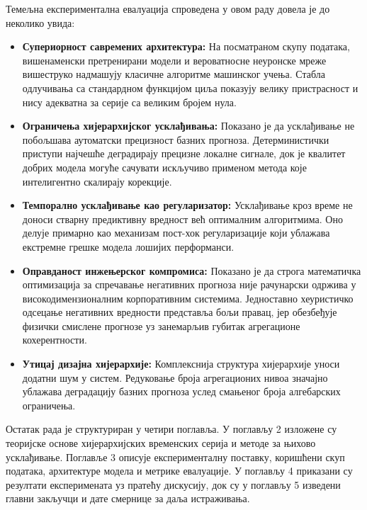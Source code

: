 \documentclass[12pt,oneside]{memoir}
\begin{document}
Темељна експериментална евалуација спроведена у овом раду довела је до неколико увида:

\begin{itemize}
    \item \textbf{Супериорност савремених архитектура:} На посматраном скупу података, вишенаменски претренирани модели и вероватносне неуронске мреже вишеструко надмашују класичне алгоритме машинског учења. Стабла одлучивања са стандардном функцијом циља показују велику пристрасност и нису адекватна за серије са великим бројем нула.
    
    \item \textbf{Ограничења хијерархијског усклађивања:} Показано је да усклађивање не побољшава аутоматски прецизност базних прогноза. Детерминистички приступи најчешће деградирају прецизне локалне сигнале, док је квалитет добрих модела могуће сачувати искључиво применом метода које интелигентно скалирају корекције.
    
    \item \textbf{Темпорално усклађивање као регуларизатор:} Усклађивање кроз време не доноси стварну предиктивну вредност већ оптималним алгоритмима. Оно делује примарно као механизам пост-хок регуларизације који ублажава екстремне грешке модела лошијих перформанси.
    
    \item \textbf{Оправданост инжењерског компромиса:} Показано је да строга математичка оптимизација за спречавање негативних прогноза није рачунарски одржива у високодимензионалним корпоративним системима. Једноставно хеуристичко одсецање негативних вредности представља бољи правац, јер обезбеђује физички смислене прогнозе уз занемарљив губитак агрегационе кохерентности.
    
    \item \textbf{Утицај дизајна хијерархије:} Комплекснија структура хијерархије уноси додатни шум у систем. Редуковање броја агрегационих нивоа значајно ублажава деградацију базних прогноза услед смањеног броја алгебарских ограничења.
\end{itemize}

Остатак рада је структуриран у четири поглавља. У поглављу 2 изложене су теоријске основе хијерархијских временских серија и методе за њихово усклађивање. Поглавље 3 описује експерименталну поставку, коришћени скуп података, архитектуре модела и метрике евалуације. У поглављу 4 приказани су резултати експеримената уз пратећу дискусију, док су у поглављу 5 изведени главни закључци и дате смернице за даља истраживања.
\end{document}
